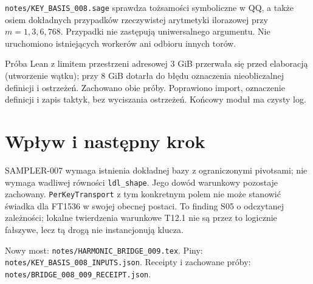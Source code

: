 \documentclass[11pt,a4paper]{article}
\newcommand{\code}[1]{\nolinkurl{#1}}
\begin{document}
\code{notes/KEY_BASIS_008.sage} sprawdza tożsamości symboliczne w QQ,
a także osiem dokładnych przypadków rzeczywistej arytmetyki ilorazowej
przy $m=1,3,6,768$. Przypadki nie zastępują uniwersalnego argumentu.
Nie uruchomiono istniejących workerów ani odbioru innych torów.

Próba Lean z limitem przestrzeni adresowej 3 GiB przerwała się przed
elaboracją (utworzenie wątku); przy 8 GiB dotarła do błędu oznaczenia
nieobliczalnej definicji i ostrzeżeń. Zachowano obie próby. Poprawiono
import, oznaczenie definicji i zapis taktyk, bez wyciszania ostrzeżeń.
Końcowy moduł ma czysty log.

\section{Wpływ i następny krok}
SAMPLER-007 wymaga istnienia dokładnej bazy z ograniczonymi pivotsami;
nie wymaga wadliwej równości \code{ldl_shape}. Jego dowód warunkowy
pozostaje zachowany. \code{PerKeyTransport} z tym konkretnym polem nie
może stanowić świadka dla FT1536 w swojej obecnej postaci. To finding
S05 o odczytanej zależności; lokalne twierdzenia warunkowe T12.1 nie są
przez to logicznie fałszywe, lecz tą drogą nie instancjonują klucza.

Nowy most: \code{notes/HARMONIC_BRIDGE_009.tex}.
Piny: \code{notes/KEY_BASIS_008_INPUTS.json}.
Receipty i zachowane próby: \code{notes/BRIDGE_008_009_RECEIPT.json}.
\end{document}
